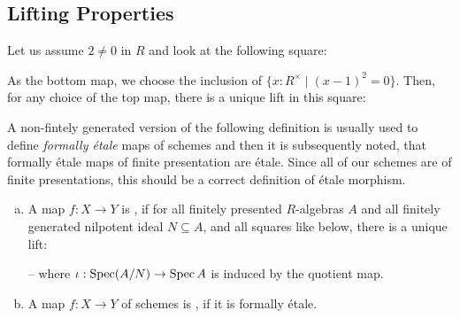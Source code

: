 
\subsection{Lifting Properties}

\begin{example}
  Let us assume $2\neq 0$ in $R$ and look at the following square:
  \begin{center}
  \end{center}
  As the bottom map, we choose the inclusion of $\{x:R^\times \mid (x-1)^2=0 \}$.
  Then, for any choice of the top map, there is a unique lift in this square:
  \begin{center}
  \end{center}
\end{example}

A non-fintely generated version of the following definition is usually used to define \emph{formally étale} maps of schemes and then it is subsequently noted,
that formally étale maps of finite presentation are étale.
Since all of our schemes are of finite presentations, this should be a correct definition of étale morphism.

\begin{definition}
  \begin{enumerate}[(a)]
  \item   A map $f:X\to Y$ is ,
    if for all finitely presented $R$-algebras $A$ and all finitely generated nilpotent ideal $N\subseteq A$,
    and all squares like below, there is a unique lift:
    \begin{center}
    \end{center}
    -- where $\iota:\operatorname{Spec} (A/N)\to \operatorname{Spec} A$ is induced by the quotient map.
  \item A map $f:X\to Y$ of schemes is , if it is formally étale.
  \end{enumerate}
\end{definition}

